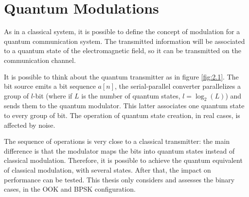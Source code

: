 \section{Quantum Modulations}
    As in a classical system, it is possible to define the concept of modulation for a 
    quantum communication system. The transmitted information will be associated to a 
    quantum state of the electromagnetic field, so it can be transmitted on the communication 
    channel.

    It is possible to think about the quantum transmitter as in figure \ref{fig:2.1}. The bit source
    emits a bit sequence $a[n]$, the serial-parallel converter parallelizes a group of $l$-bit (where
    if $L$ is the number of quantum states, $l=\log_2(L)$) and sends them to the quantum modulator.
    This latter associates one quantum state to every group of bit. The operation of quantum state 
    creation, in real cases, is affected by noise.

    The sequence of operations is very close to a classical transmitter: the main difference is that
    the modulator maps the bits into quantum states instead of classical modulation. Therefore, it is 
    possible to achieve the quantum equivalent of classical modulation, with several states. After 
    that, the impact on performance can be tested.
    This thesis only considers and assesses the binary cases, in the OOK and BPSK 
    configuration.
    
